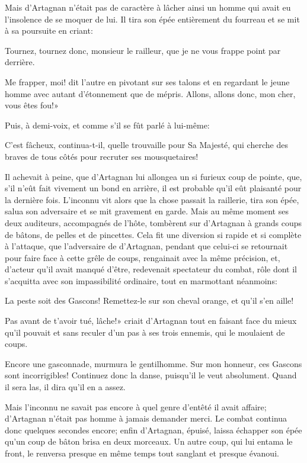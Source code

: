Mais d'Artagnan n'était pas de caractère à lâcher ainsi un homme qui avait eu l'insolence de se moquer de lui. Il tira son épée entièrement du fourreau et se mit à sa poursuite en criant: 

\speak  Tournez, tournez donc, monsieur le railleur, que je ne vous frappe point par derrière. 

\speak  Me frapper, moi! dit l'autre en pivotant sur ses talons et en regardant le jeune homme avec autant d'étonnement que de mépris. Allons, allons donc, mon cher, vous êtes fou!» 

Puis, à demi-voix, et comme s'il se fût parlé à lui-même: 

\speak  C'est fâcheux, continua-t-il, quelle trouvaille pour Sa Majesté, qui cherche des braves de tous côtés pour recruter ses mousquetaires! 

Il achevait à peine, que d'Artagnan lui allongea un si furieux coup de pointe, que, s'il n'eût fait vivement un bond en arrière, il est probable qu'il eût plaisanté pour la dernière fois. L'inconnu vit alors que la chose passait la raillerie, tira son épée, salua son adversaire et se mit gravement en garde. Mais au même moment ses deux auditeurs, accompagnés de l'hôte, tombèrent sur d'Artagnan à grands coups de bâtons, de pelles et de pincettes. Cela fit une diversion si rapide et si complète à l'attaque, que l'adversaire de d'Artagnan, pendant que celui-ci se retournait pour faire face à cette grêle de coups, rengainait avec la même précision, et, d'acteur qu'il avait manqué d'être, redevenait spectateur du combat, rôle dont il s'acquitta avec son impassibilité ordinaire, tout en marmottant néanmoins: 

\speak  La peste soit des Gascons! Remettez-le sur son cheval orange, et qu'il s'en aille! 

\speak  Pas avant de t'avoir tué, lâche!» criait d'Artagnan tout en faisant face du mieux qu'il pouvait et sans reculer d'un pas à ses trois ennemis, qui le moulaient de coups. 

\speak  Encore une gasconnade, murmura le gentilhomme. Sur mon honneur, ces Gascons sont incorrigibles! Continuez donc la danse, puisqu'il le veut absolument. Quand il sera las, il dira qu'il en a assez. 

Mais l'inconnu ne savait pas encore à quel genre d'entêté il avait affaire; d'Artagnan n'était pas homme à jamais demander merci. Le combat continua donc quelques secondes encore; enfin d'Artagnan, épuisé, laissa échapper son épée qu'un coup de bâton brisa en deux morceaux. Un autre coup, qui lui entama le front, le renversa presque en même temps tout sanglant et presque évanoui. 

